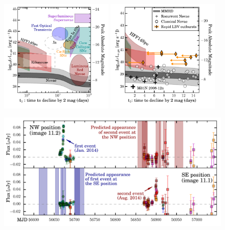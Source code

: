 \begin{figure}[tbp]
\begin{center}
\includegraphics[width=0.48\textwidth]{./figures/peakluminosity_vs_declinetime/peakluminosity_vs_declinetime_sn}
\includegraphics[width=0.48\textwidth]{./figures/peakluminosity_vs_declinetime/peakluminosity_vs_declinetime_nova_lbv}
\caption{ \protect}
\end{center}
\end{figure}

\begin{figure}[tbp]
  \begin{center}
    \includegraphics[width=\textwidth]{./figures/spock_predictions/spock_predictions}
    \caption{\protect}
  \end{center}
\end{figure}


